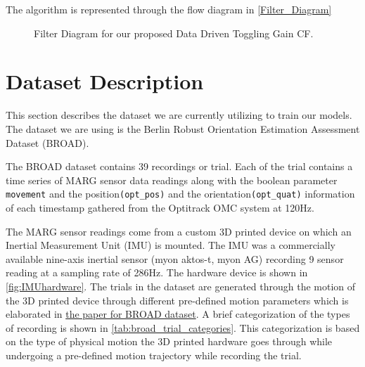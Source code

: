 \documentclass{iutbscthesis}
\begin{document}
The algorithm is represented through the flow diagram in \autoref{Filter_Diagram}

\begin{figure}
    \centering
    
    \caption[Filter Diagram for the proposed Data Driven Toggling Gain CF]{Filter Diagram\footnotemark{} for our proposed Data Driven Toggling Gain CF.}\label{Filter_Diagram}
\end{figure}

\section{Dataset Description}\label{section:dataset}
This section describes the dataset we are currently utilizing to train our models. The dataset we are using is the Berlin Robust Orientation Estimation Assessment Dataset (BROAD)\cite{BROAD}. 

The BROAD dataset contains 39 recordings or trial. Each of the trial contains a time series of MARG sensor data readings along with the boolean parameter \texttt{movement} and the position\texttt{(opt\_pos)} and the orientation\texttt{(opt\_quat)} information of each timestamp gathered from the Optitrack OMC system at 120Hz. 

The MARG sensor readings come from a custom 3D printed device on which an Inertial Measurement Unit (IMU) is mounted. The IMU was a commercially available nine-axis inertial sensor (myon aktos-t, myon AG) recording 9 sensor reading at a sampling rate of 286Hz. The hardware device is shown in \autoref{fig:IMUhardware}. The trials in the dataset are generated through the motion of the 3D printed device through different pre-defined motion parameters which is elaborated in \hyperlink{https://www.mdpi.com/2306-5729/6/7/72}{the paper for BROAD dataset}. A brief categorization of the types of recording is shown in \autoref{tab:broad_trial_categories}. This categorization is based on the type of physical motion the 3D printed hardware goes through while undergoing a pre-defined motion trajectory while recording the trial.
\end{document}

